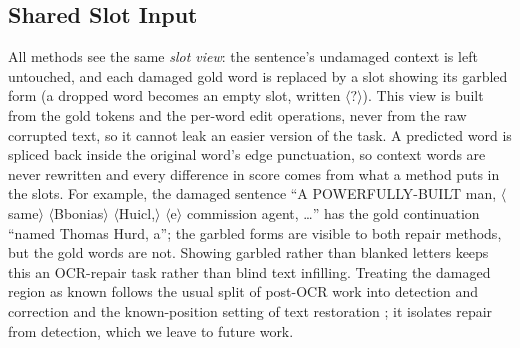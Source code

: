 \subsection{Shared Slot Input}
\label{sec:slot}
All methods see the same \emph{slot view}: the sentence's undamaged context is left untouched, and each damaged
gold word is replaced by a slot showing its garbled form (a dropped word becomes an empty slot, written
$\langle ?\rangle$). This view is built from the gold tokens and the per-word edit operations, never from the raw
corrupted text, so it cannot leak an easier version of the task. A predicted word is spliced back inside the
original word's edge punctuation, so context words are never rewritten and every difference in score comes from
what a method puts in the slots. For example, the damaged sentence ``A POWERFULLY-BUILT man,
$\langle$same$\rangle$ $\langle$Bbonias$\rangle$ $\langle$Huicl,$\rangle$ $\langle$e$\rangle$ commission agent,
\ldots{}'' has the gold continuation ``named Thomas Hurd, a''; the garbled forms are visible to both repair methods,
but the gold words are not. Showing garbled rather than blanked letters keeps this an OCR-repair task rather than
blind text infilling. Treating the damaged region as known follows the usual split of post-OCR work into detection
and correction \citep{nguyen2021survey,rigaud2019icdar} and the known-position setting of text restoration
\citep{assael2019restoring,lazar2021filling}; it isolates repair from detection, which we leave to future work.

